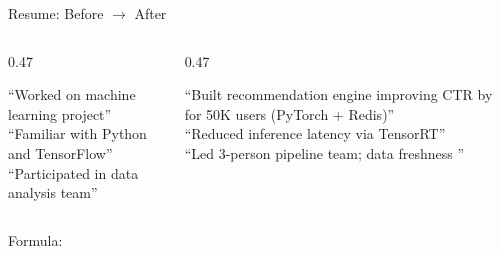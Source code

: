 \begin{frame}{Resume: Before $\rightarrow$ After}
\begin{columns}[T]
  \begin{column}{0.47\textwidth}
    \begin{highlightbox}
      \footnotesize
      ``Worked on machine learning project''\\[4pt]
      ``Familiar with Python and TensorFlow''\\[4pt]
      ``Participated in data analysis team''
    \end{highlightbox}
  \end{column}
  \begin{column}{0.47\textwidth}
    \begin{keybox}
      \footnotesize
      ``Built recommendation engine improving CTR by  for 50K users (PyTorch + Redis)''\\[4pt]
      ``Reduced inference latency  via TensorRT''\\[4pt]
      ``Led 3-person pipeline team; data freshness ''
    \end{keybox}
  \end{column}
\end{columns}
\vspace{0.8em}
\begin{center}
  {\small Formula:\ }
\end{center}
\end{frame}

